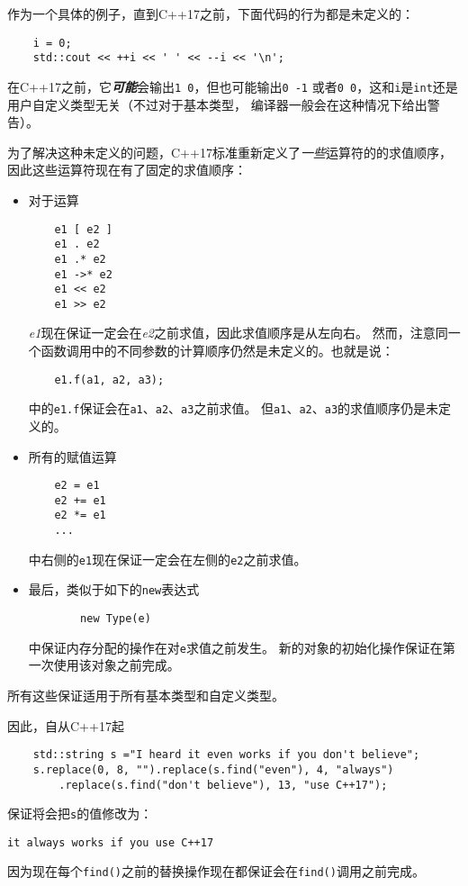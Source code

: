 作为一个具体的例子，直到C++17之前，下面代码的行为都是未定义的：
\begin{lstlisting}
    i = 0;
    std::cout << ++i << ' ' << --i << '\n';
\end{lstlisting}
在C++17之前，它\emph{\textbf{可能}}会输出\texttt{1 0}，但也可能输出\texttt{0 -1}
或者\texttt{0 0}，这和\texttt{i}是\texttt{int}还是用户自定义类型无关（不过对于基本类型，
编译器一般会在这种情况下给出警告）。

为了解决这种未定义的问题，C++17标准重新定义了\emph{一些}运算符的的求值顺序，
因此这些运算符现在有了固定的求值顺序：
\begin{itemize}[leftmargin=*]
    \item 对于运算
    \begin{lstlisting}
    e1 [ e2 ]
    e1 . e2
    e1 .* e2
    e1 ->* e2
    e1 << e2
    e1 >> e2
    \end{lstlisting}
    \emph{e1}现在保证一定会在\emph{e2}之前求值，因此求值顺序是从左向右。
    然而，注意同一个函数调用中的不同参数的计算顺序仍然是未定义的。也就是说：
    \begin{lstlisting}
    e1.f(a1, a2, a3);
    \end{lstlisting}
    中的\texttt{e1.f}保证会在\texttt{a1}、\texttt{a2}、\texttt{a3}之前求值。
    但\texttt{a1}、\texttt{a2}、\texttt{a3}的求值顺序仍是未定义的。
    \item 所有的赋值运算
    \begin{lstlisting}
    e2 = e1
    e2 += e1
    e2 *= e1
    ...
    \end{lstlisting}
    中右侧的\texttt{e1}现在保证一定会在左侧的\texttt{e2}之前求值。
    \item 最后，类似于如下的\texttt{new}表达式
    \begin{lstlisting}
        new Type(e)
    \end{lstlisting}
    中保证内存分配的操作在对\texttt{e}求值之前发生。
    新的对象的初始化操作保证在第一次使用该对象之前完成。
\end{itemize}
所有这些保证适用于所有基本类型和自定义类型。

因此，自从C++17起
\begin{lstlisting}
    std::string s ="I heard it even works if you don't believe";
    s.replace(0, 8, "").replace(s.find("even"), 4, "always")
        .replace(s.find("don't believe"), 13, "use C++17");
\end{lstlisting}
保证将会把\texttt{s}的值修改为：
\begin{lstlisting}[keywordstyle=\color{black}]
    it always works if you use C++17
\end{lstlisting}
因为现在每个\texttt{find()}之前的替换操作现在都保证会在\texttt{find()}调用之前完成。


